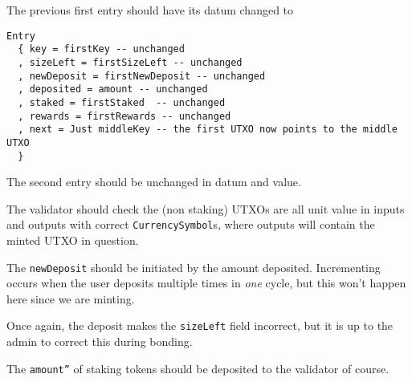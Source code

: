 \documentclass[10pt, a4paper]{article}
\theoremstyle{definition}
\begin{document}
\begin{enumerate}
{The previous first entry should have its datum changed to \begin{verbatim}
Entry
  { key = firstKey -- unchanged
  , sizeLeft = firstSizeLeft -- unchanged
  , newDeposit = firstNewDeposit -- unchanged
  , deposited = amount -- unchanged
  , staked = firstStaked  -- unchanged
  , rewards = firstRewards -- unchanged
  , next = Just middleKey -- the first UTXO now points to the middle UTXO
  }
\end{verbatim}

The second entry should be unchanged in datum and value.

The validator should check the (non staking) UTXOs are all unit value in inputs and outputs with correct \texttt{CurrencySymbol}s, where outputs will contain the minted UTXO in question.

The \texttt{newDeposit} should be initiated by the amount deposited. Incrementing occurs when the user deposits multiple times in \textit{one} cycle, but this won't happen here since we are minting.

Once again, the deposit makes the \texttt{sizeLeft} field incorrect, but it is up to the admin to correct this during bonding.

The \texttt{amount''} of staking tokens should be deposited to the validator of course.
}
\end{enumerate}
\end{document}
